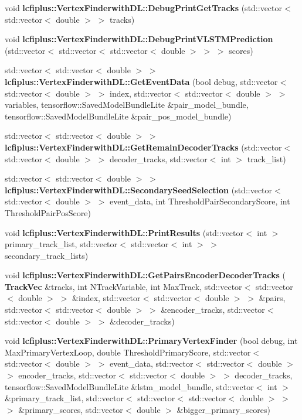 \begin{DoxyCompactItemize}
\item 
void \textbf{ lcfiplus\+::\+Vertex\+Finderwith\+D\+L\+::\+Debug\+Print\+Get\+Tracks} (std\+::vector$<$ std\+::vector$<$ double $>$ $>$ tracks)
\item 
void \textbf{ lcfiplus\+::\+Vertex\+Finderwith\+D\+L\+::\+Debug\+Print\+V\+L\+S\+T\+M\+Prediction} (std\+::vector$<$ std\+::vector$<$ std\+::vector$<$ double $>$ $>$ $>$ scores)
\item 
std\+::vector$<$ std\+::vector$<$ double $>$ $>$ \textbf{ lcfiplus\+::\+Vertex\+Finderwith\+D\+L\+::\+Get\+Event\+Data} (bool debug, std\+::vector$<$ std\+::vector$<$ double $>$ $>$ index, std\+::vector$<$ std\+::vector$<$ double $>$ $>$ variables, tensorflow\+::\+Saved\+Model\+Bundle\+Lite \&pair\+\_\+model\+\_\+bundle, tensorflow\+::\+Saved\+Model\+Bundle\+Lite \&pair\+\_\+pos\+\_\+model\+\_\+bundle)
\item 
std\+::vector$<$ std\+::vector$<$ double $>$ $>$ \textbf{ lcfiplus\+::\+Vertex\+Finderwith\+D\+L\+::\+Get\+Remain\+Decoder\+Tracks} (std\+::vector$<$ std\+::vector$<$ double $>$ $>$ decoder\+\_\+tracks, std\+::vector$<$ int $>$ track\+\_\+list)
\item 
std\+::vector$<$ std\+::vector$<$ double $>$ $>$ \textbf{ lcfiplus\+::\+Vertex\+Finderwith\+D\+L\+::\+Secondary\+Seed\+Selection} (std\+::vector$<$ std\+::vector$<$ double $>$ $>$ event\+\_\+data, int Threshold\+Pair\+Secondary\+Score, int Threshold\+Pair\+Pos\+Score)
\item 
void \textbf{ lcfiplus\+::\+Vertex\+Finderwith\+D\+L\+::\+Print\+Results} (std\+::vector$<$ int $>$ primary\+\_\+track\+\_\+list, std\+::vector$<$ std\+::vector$<$ int $>$ $>$ secondary\+\_\+track\+\_\+lists)
\item 
void \textbf{ lcfiplus\+::\+Vertex\+Finderwith\+D\+L\+::\+Get\+Pairs\+Encoder\+Decoder\+Tracks} (\textbf{ Track\+Vec} \&tracks, int N\+Track\+Variable, int Max\+Track, std\+::vector$<$ std\+::vector$<$ double $>$ $>$ \&index, std\+::vector$<$ std\+::vector$<$ double $>$ $>$ \&pairs, std\+::vector$<$ std\+::vector$<$ double $>$ $>$ \&encoder\+\_\+tracks, std\+::vector$<$ std\+::vector$<$ double $>$ $>$ \&decoder\+\_\+tracks)
\item 
void \textbf{ lcfiplus\+::\+Vertex\+Finderwith\+D\+L\+::\+Primary\+Vertex\+Finder} (bool debug, int Max\+Primary\+Vertex\+Loop, double Threshold\+Primary\+Score, std\+::vector$<$ std\+::vector$<$ double $>$ $>$ event\+\_\+data, std\+::vector$<$ std\+::vector$<$ double $>$ $>$ encoder\+\_\+tracks, std\+::vector$<$ std\+::vector$<$ double $>$ $>$ decoder\+\_\+tracks, tensorflow\+::\+Saved\+Model\+Bundle\+Lite \&lstm\+\_\+model\+\_\+bundle, std\+::vector$<$ int $>$ \&primary\+\_\+track\+\_\+list, std\+::vector$<$ std\+::vector$<$ std\+::vector$<$ double $>$ $>$ $>$ \&primary\+\_\+scores, std\+::vector$<$ double $>$ \&bigger\+\_\+primary\+\_\+scores)

\end{DoxyCompactItemize}
